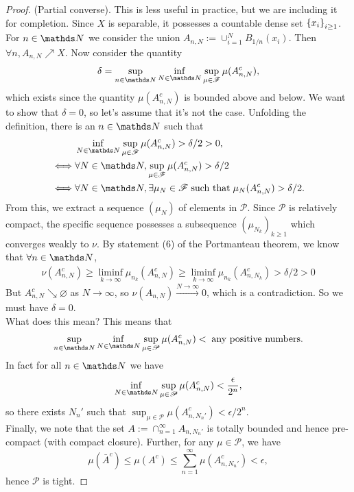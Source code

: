 \begin{unexaminable}
\begin{proof}
(Partial converse). This is less useful in practice, but we are including it for completion. Since $X$ is separable, it possesses a countable dense set $\left\{ x_i \right \}_{i\geq 1}$. For $n \in \N$ we consider the union $A_{n,N} := \cup_{i=1}^N B_{1/n}(x_i)$. Then $\forall n, A_{n,N} \nearrow X$. Now consider the quantity
\begin{equation}
\delta = \sup_{n \in \N} \inf_{N \in \N} \sup_{\mu \in \F} \mu(A_{n,N}^c),
\end{equation}
which exists since the quantity $\mu(A_{n,N}^c)$ is bounded above and below. We want to show that $\delta = 0$, so let's assume that it's not the case. Unfolding the definition, there is an $n \in \N$ such that
\begin{align*}
    &\inf_{N \in \N} \sup_{\mu \in \F} \mu(A^c_{n,N}) > \delta/2 > 0, \\
    \iff & \forall N \in \N, \sup_{\mu \in \F} \mu(A^c_{n,N}) > \delta/2 \\
    \iff & \forall N \in \N, \exists \mu_N \in \F \; \text{such that} \; \mu_N(A^c_{n,N}) > \delta/2.
\end{align*}
From this, we extract a sequence $(\mu_N)$ of elements in $\mathcal{P}$. Since $\mathcal{P}$ is relatively compact, the specific sequence possesses a subsequence $(\mu_{N_k})_{k\geq 1}$ which converges weakly to $\nu$. By statement (6) of the Portmanteau theorem, we know that $\forall n \in \N$,
\begin{align*}
    \nu(A_{n,N}^c) \geq \liminf_{k\to\infty} \mu_{n_k}(A_{n,N}^c) \geq \liminf_{k\to\infty} \mu_{n_k}(A_{n,N_k}^c) > \delta/2 > 0
\end{align*}
But $A_{n,N}^c \searrow \varnothing$ as $N \to \infty$, so $\nu(A_{n,N}) \overset{N\to\infty}{\to} 0$, which is a contradiction. So we must have $\delta = 0$. \\

What does this mean? This means that 
\begin{equation*}
\sup_{n \in \N} \inf_{N \in \N} \sup_{\mu \in \mathcal{P}} \mu(A_{n,N}^c) < \; \text{any positive numbers.}
\end{equation*}
In fact for all $n \in \N$ we have 
\begin{equation*}
\inf_{N \in \N} \sup_{\mu \in \mathcal{P}} \mu(A_{n,N}^c) < \frac{\epsilon}{2^n},
\end{equation*}
so there exists $N_n'$ such that $\sup_{\mu \in \mathcal{P}} \mu(A_{n,N_n'}^c) < \epsilon / 2^n$. \\

Finally, we note that the set $A := \cap_{n=1}^\infty A_{n,N_n'}$ is totally bounded and hence pre-compact (with compact closure). Further, for any $\mu \in \mathcal{P}$, we have
\begin{equation*}
\mu(\bar{A}^c) \leq \mu(A^c) \leq \sum_{n=1}^\infty \mu(A_{n,N_n'}^c) < \epsilon,
\end{equation*}
hence $\mathcal{P}$ is tight.
\end{proof}
\end{unexaminable}


